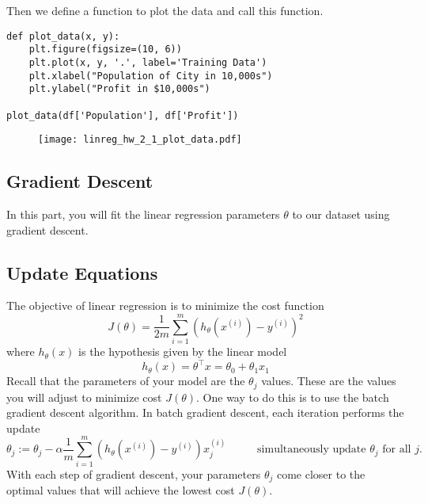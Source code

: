Then we define a function to plot the data and call this function.
\begin{verbatim}
def plot_data(x, y):
    plt.figure(figsize=(10, 6))
    plt.plot(x, y, '.', label='Training Data')
    plt.xlabel("Population of City in 10,000s")
    plt.ylabel("Profit in $10,000s")

plot_data(df['Population'], df['Profit'])
\end{verbatim}

\begin{figure}[h] %
	\centering
	\graphicspath{{./Figures/}} %
	\texttt{[image: linreg\_hw\_2\_1\_plot\_data.pdf]} 
	\label{linreg_hw_2_1_plot_data.pdf}
\end{figure}

\subsection*{Gradient Descent}
In this part, you will fit the linear regression parameters $\theta$ to our dataset using gradient descent.

\subsection*{Update Equations}
The objective of linear regression is to minimize the cost function
$$
J\left( \theta \right) = \frac{1}{2m} \sum_{i=1}^m \left( h_\theta \left( x^{\left( i\right)} \right) - y^{\left( i \right)} \right)^2
$$
where $h_\theta\left( x \right)$ is the hypothesis given by the linear model
$$
h_\theta\left( x \right) = \theta^\intercal x = \theta_0 + \theta_1 x_1
$$
Recall that the parameters of your model are the $\theta_j$ values. These are the values you will adjust to minimize cost $J(\theta)$. One way to do this is to use the batch gradient descent algorithm. In batch gradient descent, each iteration performs the update
$$
\theta_j := \theta_j - \alpha\frac{1}{m}\sum_{i=1}^m \left( h_\theta\left( x^{\left( i\right)} \right) - y^{\left(i\right)}\right) x_j^{\left(i\right)} \;\;\;\;\;\;\;\;\;\; \text{simultaneously update } \theta_j \text{ for all } j \text{.}
$$
With each step of gradient descent, your parameters $\theta_j$ come closer to the optimal values that will achieve the lowest cost $J(\theta)$.

